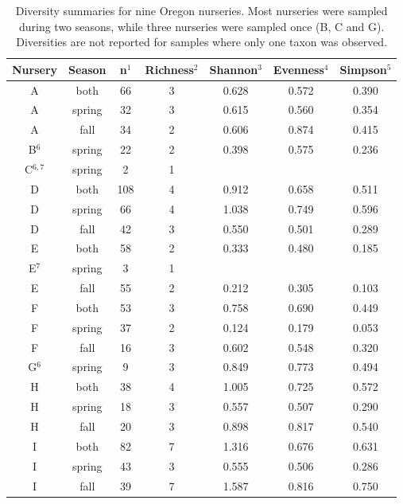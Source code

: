 \documentclass[12pt]{article}
\begin{document}
\begin{table}[ht]
\centering
\caption{Diversity summaries for nine Oregon nurseries.  Most nurseries were sampled during two seasons, while three nurseries were sampled once (B, C and G). Diversities are not reported for samples where only one taxon was observed.} 
\label{tab:div}
\begin{tabular}{ccccccc}
  \hline
 \textbf{Nursery} &  \textbf{Season} & \textbf{n}$^{1}$ & \textbf{Richness}$^{2}$ & \textbf{Shannon}$^{3}$ & \textbf{Evenness}$^{4}$ & \textbf{Simpson}$^{5}$ \\ 
  \hline
  \rowcolor{gray!20}
  A & both & 66 & 3 & 0.628 & 0.572 & 0.390 \\ 
  A & spring & 32 & 3 & 0.615 & 0.560 & 0.354 \\ 
  A & fall & 34 & 2 & 0.606 & 0.874 & 0.415 \\ 
  B$^{6}$ & spring & 22 & 2 & 0.398 & 0.575 & 0.236 \\ 
  C$^{6,7}$ & spring & 2 & 1 &  &  &  \\ 
  \rowcolor{gray!20}
  D & both & 108 & 4 & 0.912 & 0.658 & 0.511 \\ 
  D & spring & 66 & 4 & 1.038 & 0.749 & 0.596 \\ 
  D & fall & 42 & 3 & 0.550 & 0.501 & 0.289 \\ 
  \rowcolor{gray!20}
  E & both & 58 & 2 & 0.333 & 0.480 & 0.185 \\ 
  E$^{7}$ & spring & 3 & 1 &  &  &  \\ 
  E & fall & 55 & 2 & 0.212 & 0.305 & 0.103 \\ 
  \rowcolor{gray!20}
  F & both & 53 & 3 & 0.758 & 0.690 & 0.449 \\ 
  F & spring & 37 & 2 & 0.124 & 0.179 & 0.053 \\ 
  F & fall & 16 & 3 & 0.602 & 0.548 & 0.320 \\ 
  G$^{6}$ & spring & 9 & 3 & 0.849 & 0.773 & 0.494 \\ 
  \rowcolor{gray!20}
  H & both & 38 & 4 & 1.005 & 0.725 & 0.572 \\ 
  H & spring & 18 & 3 & 0.557 & 0.507 & 0.290 \\ 
  H & fall & 20 & 3 & 0.898 & 0.817 & 0.540 \\ 
  \rowcolor{gray!20}
  I & both & 82 & 7 & 1.316 & 0.676 & 0.631 \\ 
  I & spring & 43 & 3 & 0.555 & 0.506 & 0.286 \\ 
  I & fall & 39 & 7 & 1.587 & 0.816 & 0.750 \\ 

\end{tabular}
\end{table}
\end{document}
